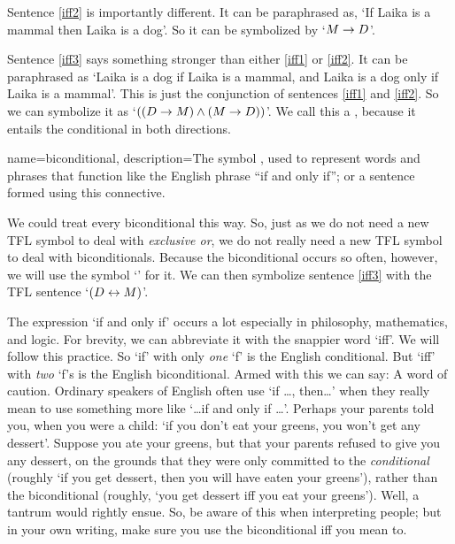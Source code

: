 Sentence \ref{iff2} is importantly different. It can be paraphrased as, `If Laika is a mammal then Laika is a dog'. So it can be symbolized by `$M \rightarrow D$'.

Sentence \ref{iff3} says something stronger than either \ref{iff1} or \ref{iff2}. It can be paraphrased as `Laika is a dog if Laika is a mammal, and Laika is a dog only if Laika is a mammal'. This is just the conjunction of sentences \ref{iff1} and \ref{iff2}. So we can symbolize it as `$((D \rightarrow M) \wedge (M \rightarrow D))$'. We call this a , because it entails the conditional in both directions. 

{
name=biconditional,
description={The symbol \eiff, used to represent words and phrases that function like the English phrase ``if and only if''; or a sentence formed using this connective.}
}

We could treat every biconditional this way. So, just as we do not need a new TFL symbol to deal with \emph{exclusive or}, we do not really need a new TFL symbol to deal with biconditionals. Because the biconditional occurs so often, however, we will use the symbol `\eiff' for it. We can then symbolize sentence \ref{iff3} with the TFL sentence `$(D \leftrightarrow M)$'. 

The expression `if and only if' occurs a lot especially in philosophy, mathematics, and logic. For brevity, we can abbreviate it with the snappier word `iff'. We will follow this practice. So `if' with only \emph{one} `f' is the English conditional. But `iff' with \emph{two} `f's is the English biconditional. Armed with this we can say:
A word of caution. Ordinary speakers of English often use `if \ldots, then\ldots' when they really mean to use something more like `\ldots if and only if \ldots'. Perhaps your parents told you, when you were a child: `if you don't eat your greens, you won't get any dessert'. Suppose you ate your greens, but that your parents refused to give you any dessert, on the grounds that they were only committed to the \emph{conditional} (roughly `if you get dessert, then you will have eaten your greens'), rather than the biconditional (roughly, `you get dessert iff you eat your greens'). Well, a tantrum would rightly ensue. So, be aware of this when interpreting people; but in your own writing, make sure you use the biconditional iff you mean to.

